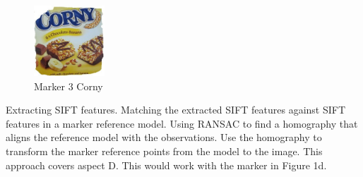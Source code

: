 \begin{figure}[ht!]
	\centering
	\includegraphics[width=100px]{figures/Marker3}
	\caption{Marker 3 Corny}
	\label{fig:markerColor}
\end{figure}


Extracting SIFT features. Matching the extracted SIFT features against
SIFT features in a marker reference model. Using RANSAC to find
a homography that aligns the reference model with the observations.
Use the homography to transform the marker reference points from
the model to the image. This approach covers aspect D. This would
work with the marker in Figure 1d.
